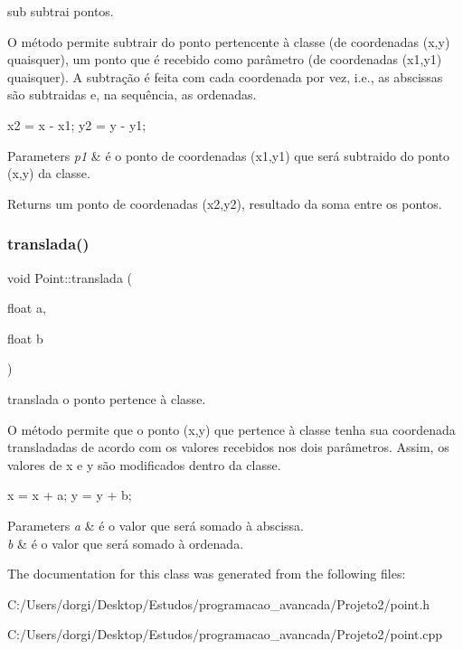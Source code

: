 sub subtrai pontos. 

O método permite subtrair do ponto pertencente à classe (de coordenadas (x,y) quaisquer), um ponto que é recebido como parâmetro (de coordenadas (x1,y1) quaisquer). A subtração é feita com cada coordenada por vez, i.\+e., as abscissas são subtraidas e, na sequência, as ordenadas.

x2 = x -\/ x1; y2 = y -\/ y1;


\begin{DoxyParams}{Parameters}
{\em p1} & é o ponto de coordenadas (x1,y1) que será subtraido do ponto (x,y) da classe.\\
\hline
\end{DoxyParams}
\begin{DoxyReturn}{Returns}
um ponto de coordenadas (x2,y2), resultado da soma entre os pontos. 
\end{DoxyReturn}
\mbox{\label{class_point_ad9676e36f3444534b609e3c68422239a}} 
\subsubsection{\texorpdfstring{translada()}{translada()}}
{\footnotesize\ttfamily void Point\+::translada (\begin{DoxyParamCaption}\item[{float}]{a,  }\item[{float}]{b }\end{DoxyParamCaption})}



translada o ponto pertence à classe. 

O método permite que o ponto (x,y) que pertence à classe tenha sua coordenada transladadas de acordo com os valores recebidos nos dois parâmetros. Assim, os valores de x e y são modificados dentro da classe.

x = x + a; y = y + b;


\begin{DoxyParams}{Parameters}
{\em a} & é o valor que será somado à abscissa.\\
\hline
{\em b} & é o valor que será somado à ordenada. \\
\hline
\end{DoxyParams}


The documentation for this class was generated from the following files\+:\begin{DoxyCompactItemize}
\item 
C\+:/\+Users/dorgi/\+Desktop/\+Estudos/programacao\+\_\+avancada/\+Projeto2/point.\+h\item 
C\+:/\+Users/dorgi/\+Desktop/\+Estudos/programacao\+\_\+avancada/\+Projeto2/point.\+cpp\end{DoxyCompactItemize}
